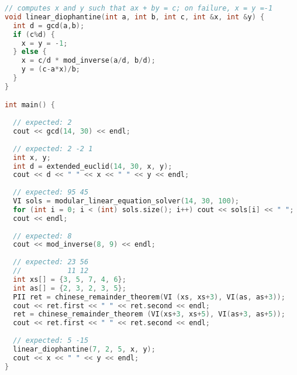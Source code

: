 \begin{lstlisting}[language=C++]
// computes x and y such that ax + by = c; on failure, x = y =-1
void linear_diophantine(int a, int b, int c, int &x, int &y) {
  int d = gcd(a,b);
  if (c%d) {
    x = y = -1;
  } else {
    x = c/d * mod_inverse(a/d, b/d);
    y = (c-a*x)/b;
  }
}

int main() {
  
  // expected: 2
  cout << gcd(14, 30) << endl;
  
  // expected: 2 -2 1
  int x, y;
  int d = extended_euclid(14, 30, x, y);
  cout << d << " " << x << " " << y << endl;
  
  // expected: 95 45
  VI sols = modular_linear_equation_solver(14, 30, 100);
  for (int i = 0; i < (int) sols.size(); i++) cout << sols[i] << " "; 
  cout << endl;
  
  // expected: 8
  cout << mod_inverse(8, 9) << endl;
  
  // expected: 23 56
  //           11 12
  int xs[] = {3, 5, 7, 4, 6};
  int as[] = {2, 3, 2, 3, 5};
  PII ret = chinese_remainder_theorem(VI (xs, xs+3), VI(as, as+3));
  cout << ret.first << " " << ret.second << endl;
  ret = chinese_remainder_theorem (VI(xs+3, xs+5), VI(as+3, as+5));
  cout << ret.first << " " << ret.second << endl;
  
  // expected: 5 -15
  linear_diophantine(7, 2, 5, x, y);
  cout << x << " " << y << endl;
}
\end{lstlisting}